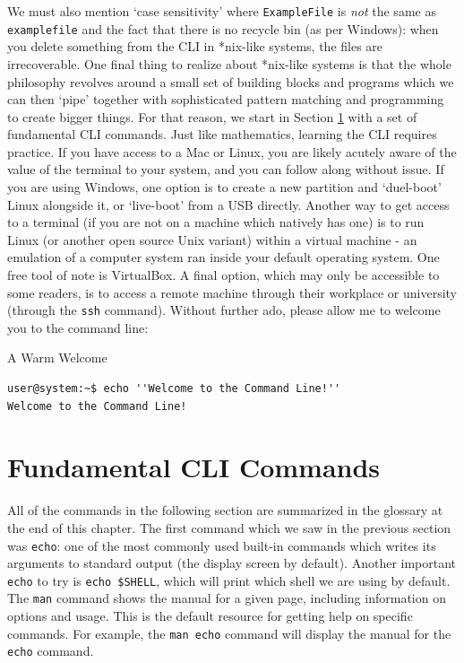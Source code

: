 \documentclass[11pt]{article}
\begin{document}
We must also mention `case sensitivity' where \texttt{ExampleFile} is \emph{not} the same as \texttt{examplefile} and the fact that there is no recycle bin (as per Windows): when you delete something from the CLI in *nix-like systems, the files are irrecoverable. One final thing to realize about *nix-like systems is that the whole philosophy revolves around a small set of building blocks and programs which we can then `pipe' together with sophisticated pattern matching and programming to create bigger things. For that reason, we start in Section \ref{fundamentalclicommands} with a set of fundamental CLI commands. Just like mathematics, learning the CLI requires practice. If you have access to a Mac or Linux, you are likely acutely aware of the value of the terminal to your system, and you can follow along without issue. If you are using Windows, one option is to create a new partition and `duel-boot' Linux alongside it, or `live-boot' from a USB directly. Another way to get access to a terminal (if you are not on a machine which natively has one) is to run Linux (or another open source Unix variant) within a virtual machine - an emulation of a computer system ran inside your default operating system. One free tool of note is VirtualBox. A final option, which may only be accessible to some readers, is to access a remote machine through their workplace or university (through the \texttt{ssh} command). Without further ado, please allow me to welcome you to the command line:\\

\begin{listing}[H]
\caption{A Warm Welcome}\vspace{-0.1in}
\begin{verbatim}
user@system:~$ echo ''Welcome to the Command Line!''
Welcome to the Command Line!
\end{verbatim}
\end{listing}

\noindent
\section{Fundamental CLI Commands}\label{fundamentalclicommands}

All of the commands in the following section are summarized in the glossary at the end of this chapter. The first command which we saw in the previous section was \texttt{echo}: one of the most commonly used built-in commands which writes its arguments to standard output (the display screen by default). Another important \texttt{echo} to try is \texttt{echo \$SHELL}, which will print which shell we are using by default. The \texttt{man} command shows the manual for a given page, including information on options and usage. This is the default resource for getting help on specific commands. For example, the \texttt{man echo} command will display the manual for the \texttt{echo} command.\\
\end{document}
